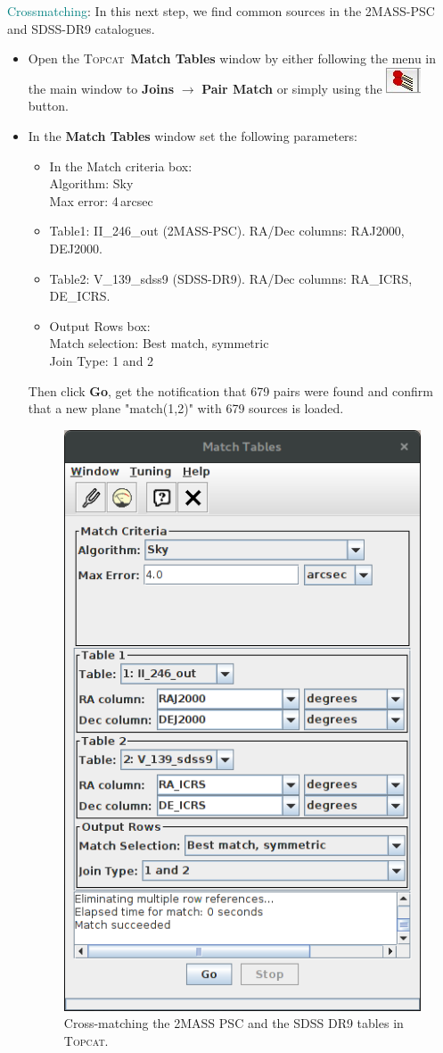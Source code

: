 \documentclass [a4paper, 12pt]{article}
\newcommand{\topcat}{{\textsc{Topcat}}}
\begin{document}
\noindent \textcolor{teal}{Crossmatching}: In this next step, we find common 
sources in the 2MASS-PSC and SDSS-DR9 catalogues. 
\begin{itemize}
    \item Open the \topcat\ \textbf{Match Tables} window by either following 
    the menu in the main window to \textbf{Joins} $\rightarrow$ \textbf{Pair 
    Match} or simply using the \includegraphics[width=0.04 
    \textwidth]{../images/topcat_button_xmatch.jpg} button. 
    \item In the \textbf{Match Tables} window set the following parameters:
    \begin{itemize}
        \item In the Match criteria box:\\
        Algorithm: Sky\\
        Max error: 4\,arcsec
        \item Table1: II\_246\_out (2MASS-PSC). RA/Dec columns: RAJ2000,
        DEJ2000.
        \item Table2: V\_139\_sdss9 (SDSS-DR9). RA/Dec columns: RA\_ICRS,
        DE\_ICRS.
        \item Output Rows box:\\
        Match selection: Best match, symmetric\\
        Join Type: 1 and 2
    \end{itemize}
    Then click \textbf{Go}, get the notification that 679 pairs were found and 
    confirm that a new plane "match(1,2)" with 679 sources is loaded.
    \begin{figure}[H]
        \center
        \includegraphics[width=0.4 
        \textwidth]{../images/topcat_match_2MASS_SDSS.png}
        \caption{Cross-matching the 2MASS PSC and the SDSS DR9 tables in 
        \topcat. }
        \label{fig:crossmatch_topcat}
    \end{figure}
\end{itemize}
\end{document}
